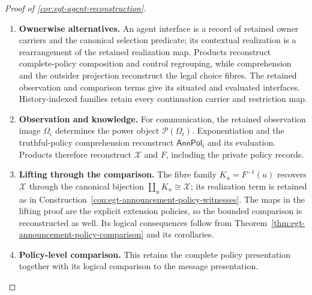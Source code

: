 \documentclass[11pt,a4paper]{article}
\numberwithin{equation}{section}
\theoremstyle{definition}
\theoremstyle{remark}
\theoremstyle{plain}
\begin{document}
\begin{proof}[Proof of \cref{cor:egt-agent-reconstruction}]
\leavevmode
\begin{enumerate}[label=\textup{(\arabic*)},leftmargin=*,itemsep=4pt,topsep=3pt]
  \item \textbf{Ownerwise alternatives.} An agent interface is a record of retained owner carriers and the canonical
selection predicate; its contextual realization is a rearrangement of the
retained realization map. Products reconstruct complete-policy composition
and control regrouping, while comprehension and the outsider projection
reconstruct the legal choice fibres. The retained observation and comparison
terms give its situated and evaluated interfaces. History-indexed families
retain every continuation carrier and restriction map.
  \item \textbf{Observation and knowledge.} For communication, the retained observation image $\Omega_i$ determines the
power object $\mathcal P(\Omega_i)$. Exponentiation and the truthful-policy
comprehension reconstruct $\mathsf{AnnPol}_i$ and its evaluation. Products
therefore reconstruct $\mathcal X$ and $F$, including the private policy
records.
  \item \textbf{Lifting through the comparison.} The fibre family $K_u=F^{-1}(u)$ recovers $\mathcal X$ through the
canonical bijection $\coprod_u K_u\cong\mathcal X$; its realization term is
retained as in Construction~\ref{con:egt-announcement-policy-witnesses}. The maps in the lifting proof are the explicit extension policies, so the
bounded comparison is reconstructed as well. Its logical consequences follow
from Theorem~\ref{thm:egt-announcement-policy-comparison} and its corollaries.
  \item \textbf{Policy-level comparison.} This retains the complete policy presentation together with its logical
comparison to the message presentation.
\end{enumerate}
\end{proof}
\end{document}
